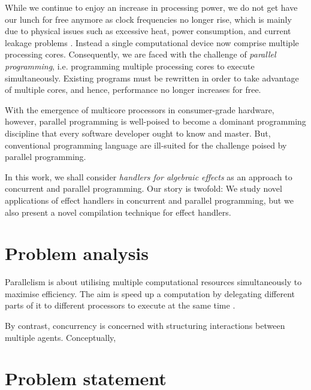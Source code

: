 \documentclass[mscres,cdtppar,twoside,openright,logo,rightchapter,normalheadings]{infthesis}
\theoremstyle{definition}
\begin{document}
%

While we continue to enjoy an increase in processing power, we do not
get have our lunch for free anymore as clock frequencies no longer
rise, which is mainly due to physical issues such as excessive heat,
power consumption, and current leakage problems
\citep{Sutter2005}. Instead a single computational device now comprise
multiple processing cores. Consequently, we are faced with the
challenge of \emph{parallel programming}, i.e.  programming multiple
processing cores to execute simultaneously. Existing programs must be
rewritten in order to take advantage of multiple cores, and hence,
performance no longer increases for free.

%

With the emergence of multicore processors in consumer-grade hardware,
however, parallel programming is well-poised to become a dominant
programming discipline that every software developer ought to know and
master. But, conventional programming language are ill-suited for the
challenge poised by parallel programming.

%

In this work, we shall consider \emph{handlers for algebraic effects}
\citep{Plotkin2001,Plotkin2003,Plotkin2013} as an approach to
concurrent and parallel programming. Our story is twofold: We study
novel applications of effect handlers in concurrent and parallel
programming, but we also present a novel compilation technique for
effect handlers.

\section{Problem analysis}

Parallelism is about utilising multiple computational resources
simultaneously to maximise efficiency. The aim is speed up a
computation by delegating different parts of it to different
processors to execute at the same time \citep{Marlow2013}. 

By contrast, concurrency is concerned with structuring interactions
between multiple agents. Conceptually, 



\section{Problem statement}
\end{document}
